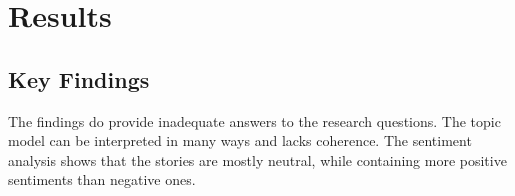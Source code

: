 \section{Results}

\subsection*{Key Findings}

The findings do provide inadequate answers to the research questions. The topic model can be interpreted in many ways and lacks coherence. The sentiment analysis shows that the stories are mostly neutral, while containing more positive sentiments than negative ones.

